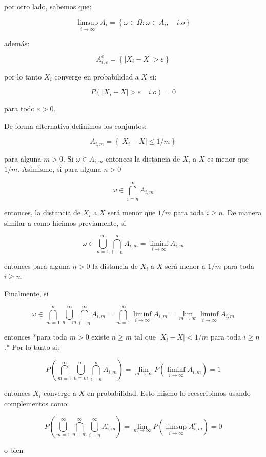 \documentclass{extreport}
\theoremstyle{definicion}
\theoremstyle{propiedad}
\begin{document}
por otro lado, sabemos que:

$$
\limsup_{i\rightarrow\infty}A_i = \left\{\omega\in\Omega: \omega\in A_i, \quad i.o\right\}
$$

 además: 

$$
A^c_{i,\varepsilon}=\left\{\left|X_i-X\right\vert>\varepsilon\right\}
$$

por lo tanto $X_i$ converge en probabilidad a $X$ si:

$$
P\left(\left|X_i-X\right| >\varepsilon\quad i.o\right) = 0
$$

para todo $\varepsilon>0$.

De forma alternativa definimos los conjuntos:

$$
A_{i,m} = \left\{\vert X_i-X\vert \leq 1/m\right\}
$$

para alguna $m>0$. Si $\omega \in A_{i,m}$ entonces la distancia de $X_i$ a $X$ es menor que $1/m$. Asimismo, si para alguna  $n>0$

$$
\omega \in \bigcap_{i=n}^\infty A_{i,m}
$$

entonces, la distancia de $X_i$ a $X$ será menor que $1/m$ para toda $i\geq n$. De manera similar a como hicimos previamente, si 

$$
\omega \in \bigcup_{n=1}^\infty\bigcap_{i=n}^\infty A_{i,m} = \liminf_{i\rightarrow \infty} A_{i,m}
$$

entonces para alguna $n>0$ la distancia de $X_i$ a $X$ será menor a $1/m$ para toda $i\geq n$. 

Finalmente, si 

$$
\omega \in \bigcap_{m=1}^\infty\bigcup_{n=m}^\infty\bigcap_{i=n}^\infty A_{i,m} = \bigcap_{m=1}^\infty\liminf_{i\rightarrow \infty} A_{i,m} = \lim_{m\rightarrow\infty}\liminf_{i\rightarrow \infty} A_{i,m}
$$

entonces *para toda $m>0$ existe $n\geq m$ tal que $\vert X_i-X\vert < 1/m$ para toda $i\geq n$.* Por lo tanto si:

$$
P\left(\bigcap_{m=1}^\infty\bigcup_{n=m}^\infty\bigcap_{i=n}^\infty A_{i,m}\right) =\lim_{m\rightarrow\infty}P\left(\liminf_{i\rightarrow \infty} A_{i,m}\right) = 1
$$

entonces $X_i$ converge a $X$ en probabilidad. Esto mismo lo reescribimos usando complementos como:

$$
P\left(\bigcup_{m=1}^\infty\bigcap_{n=m}^\infty\bigcup_{i=n}^\infty A^c_{i,m}\right) =\lim_{m\rightarrow\infty}P\left(\limsup_{i\rightarrow \infty} A^c_{i,m}\right) = 0
$$

o bien
\end{document}
